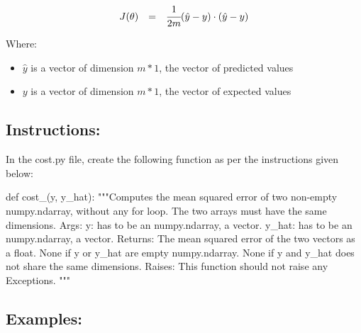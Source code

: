 \documentclass[]{article}
\newenvironment{Shaded}{\begin{snugshade}}{\end{snugshade}}
\newcommand{\CommentTok}[1]{\textcolor[rgb]{0.48,0.49,0.49}{#1}}
\newcommand{\KeywordTok}[1]{\textcolor[rgb]{0.81,0.81,0.76}{#1}}
\newcommand{\NormalTok}[1]{\textcolor[rgb]{0.81,0.81,0.76}{#1}}
\begin{document}
\[
\begin{matrix}
J(\theta) &  = & \cfrac{1}{2m}(\hat{y} - y) \cdot(\hat{y}- y)
\end{matrix}
\] \normalsize

Where:

\begin{itemize}
\item
  \(\hat{y}\) is a vector of dimension \(m * 1\), the vector of
  predicted values
\item
  \(y\) is a vector of dimension \(m * 1\), the vector of expected
  values
\end{itemize}

\hypertarget{instructions-5}{%
\subsection{Instructions:}\label{instructions-5}}

In the cost.py file, create the following function as per the
instructions given below:

\begin{Shaded}
\begin{Highlighting}[]
\KeywordTok{def}\NormalTok{ cost_(y, y_hat):}
    \CommentTok{"""Computes the mean squared error of two non-empty numpy.ndarray, without any for loop. The two arrays must have the same dimensions.}
\CommentTok{    Args:}
\CommentTok{      y: has to be an numpy.ndarray, a vector.}
\CommentTok{      y_hat: has to be an numpy.ndarray, a vector.}
\CommentTok{    Returns:}
\CommentTok{      The mean squared error of the two vectors as a float.}
\CommentTok{      None if y or y_hat are empty numpy.ndarray.}
\CommentTok{      None if y and y_hat does not share the same dimensions.}
\CommentTok{    Raises:}
\CommentTok{      This function should not raise any Exceptions.}
\CommentTok{    """}
\end{Highlighting}
\end{Shaded}

\hypertarget{examples-6}{%
\subsection{Examples:}\label{examples-6}}
\end{document}
